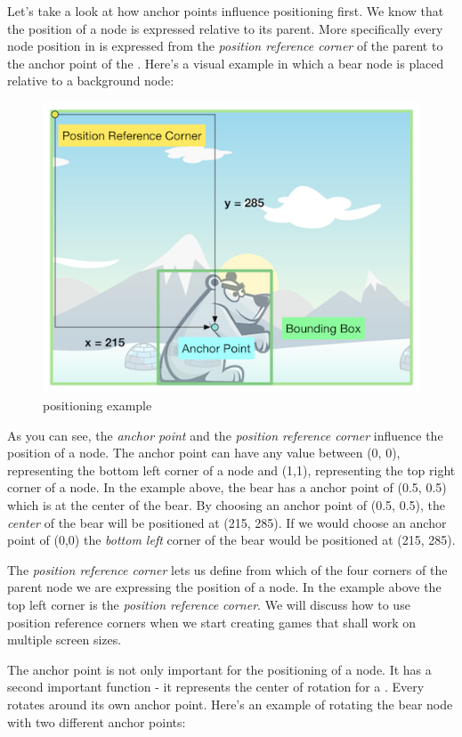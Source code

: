 Let's take a look at how anchor points influence positioning first. We know that
the position of a node is expressed relative to its parent. More specifically every node position in
\cocos{} is expressed from the \textit{position reference corner} of the parent
to the anchor point of the \ccnode{}. Here's a visual example in which a bear
node is placed relative to a background node:

\begin{figure}[H]
		\centering
		\includegraphics[width=0.5\linewidth]{images/cocos2d/ccnode/NodePositioning.png}     
		\caption{\ccnode{} positioning example}
\end{figure}

As you can see, the \textit{anchor point} and the \textit{position reference
corner} influence the position of a node. The anchor point can have any value
between (0, 0), representing the bottom left corner of a node and (1,1),
representing the top right corner of a node. In the example above, the bear has
a anchor point of (0.5, 0.5) which is at the center of the bear. By choosing an
anchor point of (0.5, 0.5), the \textit{center} of the bear will be positioned
at (215, 285). If we would choose an anchor point of (0,0) the \textit{bottom
left} corner of the bear would be positioned at (215, 285).

The \textit{position reference
corner} lets us define from which of the four corners of the parent node we are
expressing the position of a node. In the example above the top left corner is
the \textit{position reference corner}. We will discuss how to use position reference corners when we start 
creating games that shall work on multiple screen sizes.

The anchor point is not only important for the positioning of a node. It has a
second important function - it represents the center of rotation for a
\ccnode{}. Every \ccnode{} rotates around its own anchor point. Here's an
example of rotating the bear node with two different anchor points:

